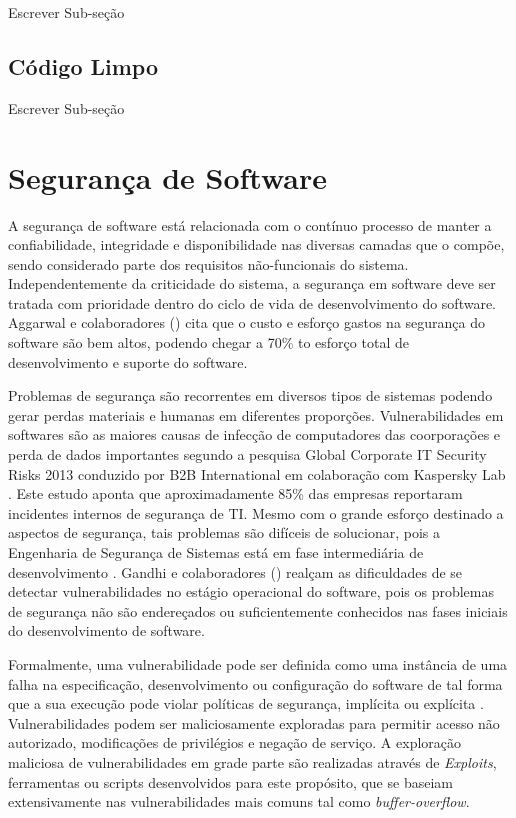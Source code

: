 Escrever Sub-seção

\subsection{Código Limpo}
\label{sec-clean-code}

Escrever Sub-seção





\section{Segurança de Software}
\label{sec-metrics-security}

A segurança de software está relacionada com o contínuo processo de manter a confiabilidade, integridade e disponibilidade nas diversas camadas que o compõe, sendo considerado parte dos requisitos não-funcionais do sistema. Independentemente da criticidade do sistema, a segurança em software deve ser tratada com prioridade dentro do ciclo de vida de desenvolvimento do software. Aggarwal e colaboradores (\citeyear{aggarwal2002}) cita que o custo e esforço gastos na segurança do software são bem altos, podendo chegar a 70\% to esforço total de desenvolvimento e suporte do software.

%

Problemas de segurança são recorrentes em diversos tipos de sistemas podendo gerar perdas materiais e humanas em diferentes proporções. Vulnerabilidades em softwares são as maiores causas de infecção de computadores das coorporações e perda de dados importantes segundo a pesquisa Global Corporate IT Security Risks 2013 conduzido por B2B International em colaboração com Kaspersky Lab \cite{b2binternational2013}. Este estudo aponta que aproximadamente 85\% das empresas reportaram incidentes internos de segurança de TI. Mesmo com o grande esforço destinado a aspectos de segurança, tais problemas são difíceis de solucionar, pois a Engenharia de Segurança de Sistemas está em fase intermediária de desenvolvimento \cite{pascoa2002}. Gandhi e colaboradores (\citeyear{gandhi2013}) realçam as dificuldades de se detectar vulnerabilidades no estágio operacional do software, pois os problemas de segurança não são endereçados ou suficientemente conhecidos nas fases iniciais do desenvolvimento de software. 

%

Formalmente, uma vulnerabilidade pode ser definida como uma instância de uma falha na especificação, desenvolvimento ou configuração do software de tal forma que a sua execução pode violar políticas de segurança, implícita ou explícita \cite{krsul1998}. Vulnerabilidades podem ser maliciosamente exploradas para permitir acesso não autorizado, modificações de privilégios e negação de serviço. A exploração maliciosa de vulnerabilidades em grade parte são realizadas através de \emph{Exploits}, ferramentas ou scripts desenvolvidos para este propósito, que se baseiam extensivamente nas vulnerabilidades mais comuns tal como \emph{buffer-overflow}. 

